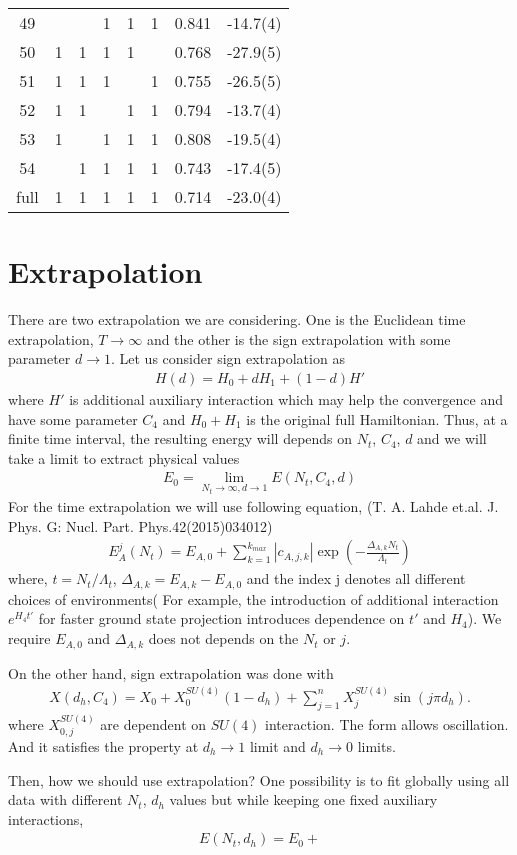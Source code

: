 \documentclass[10pt]{book}
\newcommand{\bea}{\begin{eqnarray}}
\newcommand{\eea}{\end{eqnarray}}
\begin{document}
\begin{table}
\begin{center}
\begin{tabular}{c|ccccc|cc}
49    &   &  & 1 & 1 & 1 & 0.841 & -14.7(4) \\
50    & 1 & 1 & 1 & 1 &  & 0.768 & -27.9(5) \\
51    & 1 & 1 & 1 &   & 1 & 0.755& -26.5(5) \\
52    & 1 & 1 &  & 1  & 1 & 0.794 &-13.7(4) \\
53    & 1 &   & 1 & 1 & 1 & 0.808 & -19.5(4) \\
54   &    & 1 & 1 & 1 & 1 & 0.743 & -17.4(5)\\
full & 1 & 1 & 1  & 1 & 1 & 0.714 & -23.0(4) \\
\end{tabular}  
\end{center} 
\end{table} 


\chapter{Extrapolation}
There are two extrapolation we are considering. One is the Euclidean time extrapolation,
$T\to \infty$ and the other is the sign extrapolation with some parameter $d\to 1$.
Let us consider sign extrapolation as
\bea 
H(d)=H_0+d H_1 +(1-d) H'
\eea 
where $H'$ is additional auxiliary interaction which may help the convergence
and have some parameter $C_4$
and $H_0+H_1$ is the original full Hamiltonian. Thus, at a finite time interval,
the resulting energy will depends on $N_t$, $C_4$, $d$ and we will take a limit
to extract physical values
\bea
E_0=\lim_{N_t\to \infty, d\to 1} E(N_t,C_4,d)
\eea 
For the time extrapolation we will use following equation,
(T. A. Lahde et.al. J. Phys. G: Nucl. Part. Phys.42(2015)034012) 
\bea 
E_A^j(N_t)=E_{A,0}+\sum_{k=1}^{k_{max}}|c_{A,j,k}|
\exp\left(-\frac{\Delta_{A,k} N_t}{\Lambda_t}  \right) 
\eea 
where, $t=N_t/\Lambda_t$, $\Delta_{A,k}=E_{A,k}-E_{A,0}$
and the index j denotes all different choices of environments(
For example, the introduction of additional interaction
$e^{ H_4 t'}$ for faster ground state projection
introduces dependence on $t'$ and $H_4$).
We require $E_{A,0}$ and $\Delta_{A,k}$ does not depends on the $N_t$ or $j$.

On the other hand, sign extrapolation was done with
\bea 
X(d_h,C_4)=X_0+X_0^{SU(4)}(1-d_h)+\sum_{j=1}^n X_j^{SU(4)}\sin(j\pi d_h).
\eea 
where $X_{0,j}^{SU(4)}$ are dependent on $SU(4)$ interaction. 
The form allows oscillation. And it satisfies the property at $d_h\to 1$
limit and $d_h\to 0$ limits. 

Then, how we should use extrapolation? One possibility is to fit globally using
all data with different $N_t$, $d_h$ values but while keeping one fixed
auxiliary interactions,
\bea 
E(N_t,d_h)=E_0+
\eea 
 
\end{document}
